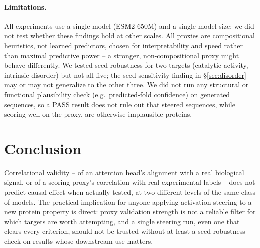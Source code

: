 \documentclass{article}
\begin{document}
\paragraph{Limitations.} All experiments use a single model
(ESM2-650M) and a single model size; we did not test whether these
findings hold at other scales. All proxies are compositional heuristics,
not learned predictors, chosen for interpretability and speed rather
than maximal predictive power -- a stronger, non-compositional proxy
might behave differently. We tested seed-robustness for two targets
(catalytic activity, intrinsic disorder) but not all five; the
seed-sensitivity finding in \S\ref{sec:disorder} may or may not
generalize to the other three. We did not run any structural or
functional plausibility check (e.g.\ predicted-fold confidence) on
generated sequences, so a PASS result does not rule out that steered
sequences, while scoring well on the proxy, are otherwise implausible
proteins.

\section{Conclusion}

Correlational validity -- of an attention head's alignment with a real
biological signal, or of a scoring proxy's correlation with real
experimental labels -- does not predict causal effect when actually
tested, at two different levels of the same class of models. The
practical implication for anyone applying activation steering to a new
protein property is direct: proxy validation strength is not a
reliable filter for which targets are worth attempting, and a single
steering run, even one that clears every criterion, should not be
trusted without at least a seed-robustness check on results whose
downstream use matters.



\end{document}
